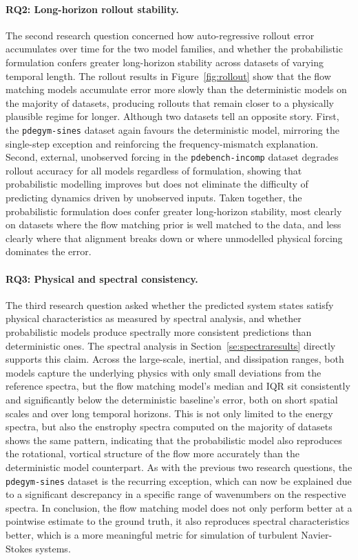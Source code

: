 \paragraph{RQ2: Long-horizon rollout stability.} The second research question concerned how auto-regressive rollout error accumulates over time for the two model families, and whether the probabilistic formulation confers greater long-horizon stability across datasets of varying temporal length. The rollout results in Figure~\ref{fig:rollout} show that the flow matching models accumulate error more slowly than the deterministic models on the majority of datasets, producing rollouts that remain closer to a physically plausible regime for longer. Although two datasets tell an opposite story. First, the \texttt{pdegym-sines} dataset again favours the deterministic model, mirroring the single-step exception and reinforcing the frequency-mismatch explanation. Second, external, unobserved forcing in the \texttt{pdebench-incomp} dataset degrades rollout accuracy for all models regardless of formulation, showing that probabilistic modelling improves but does not eliminate the difficulty of predicting dynamics driven by unobserved inputs. Taken together, the probabilistic formulation does confer greater long-horizon stability, most clearly on datasets where the flow matching prior is well matched to the data, and less clearly where that alignment breaks down or where unmodelled physical forcing dominates the error.

\paragraph{RQ3: Physical and spectral consistency.} The third research question asked whether the predicted system states satisfy physical characteristics as measured by spectral analysis, and whether probabilistic models produce spectrally more consistent predictions than deterministic ones. The spectral analysis in Section~\ref{se:spectraresults} directly supports this claim. Across the large-scale, inertial, and dissipation ranges, both models capture the underlying physics with only small deviations from the reference spectra, but the flow matching model's median and IQR sit consistently and significantly below the deterministic baseline's error, both on short spatial scales and over long temporal horizons. This is not only limited to the energy spectra, but also the enstrophy spectra computed on the majority of datasets shows the same pattern, indicating that the probabilistic model also reproduces the rotational, vortical structure of the flow more accurately than the deterministic model counterpart. As with the previous two research questions, the \texttt{pdegym-sines} dataset is the recurring exception, which can now be explained due to a significant descrepancy in a specific range of wavenumbers on the respective spectra. In conclusion, the flow matching model does not only perform better at a pointwise estimate to the ground truth, it also reproduces spectral characteristics better, which is a more meaningful metric for simulation of turbulent Navier-Stokes systems.

